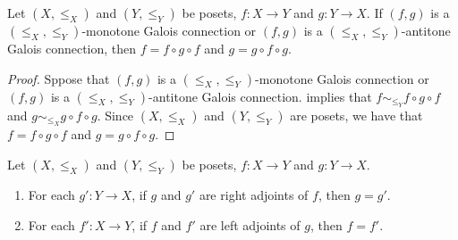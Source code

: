 \documentclass{book}
\begin{document}
	\begin{ex} 
		Let $(X, \leq_X)$ and $(Y, \leq_Y)$ be posets, $f: X \rightarrow Y$ and $g:Y \rightarrow X$. If $(f,g)$ is a $(\leq_X, \leq_Y)$-monotone Galois connection or $(f,g)$ is a $(\leq_X, \leq_Y)$-antitone Galois connection, then $f = f \circ g \circ f$ and $g = g \circ f \circ g$.
	\end{ex}
	
	\begin{proof}
		Sppose that $(f,g)$ is a $(\leq_X, \leq_Y)$-monotone Galois connection or $(f,g)$ is a $(\leq_X, \leq_Y)$-antitone Galois connection.  implies that $f \sim_{\leq_Y} f \circ g \circ f$ and $g \sim_{\leq_X} g \circ f \circ g$. Since $(X, \leq_X)$ and $(Y, \leq_Y)$ are posets, we have that $f = f \circ g \circ f$ and $g = g \circ f \circ g$.
	\end{proof}
	
	\begin{ex} 
		Let $(X, \leq_X)$ and $(Y, \leq_Y)$ be posets, $f: X \rightarrow Y$ and $g:Y \rightarrow X$. 
		\begin{enumerate}
			\item For each $g':Y \rightarrow X$, if $g$ and $g'$ are right adjoints of $f$, then $g = g'$. 
			\item For each $f':X \rightarrow Y$, if $f$ and $f'$ are left adjoints of $g$, then $f = f'$. 
		\end{enumerate}
	\end{ex}
	
\end{document}
